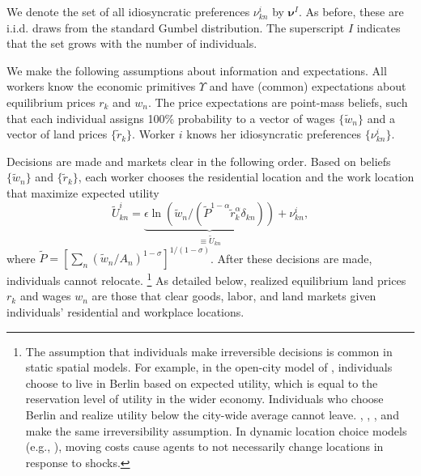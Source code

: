 \documentclass[11pt]{article}
\theoremstyle{definition}
\newcommand\idiosyncraticphrase{idiosyncratic preference}
\begin{document}
We denote the set of all idiosyncratic preferences $\nu_{kn}^i$ by $\boldsymbol \nu^{I}$.
As before, these are i.i.d. draws from the standard Gumbel distribution.
The superscript $I$ indicates that the set grows with the number of individuals.

We make the following assumptions about information and expectations.
All workers know the economic primitives $\Upsilon$
and have (common) expectations about equilibrium prices $r_k$ and $w_n$.
The price expectations are point-mass beliefs,
such that each individual assigns 100\% probability to a vector of wages $\{\tilde{w}_{n}\}$ and a vector of land prices $\{\tilde{r}_{k}\}$.
Worker $i$ knows her \idiosyncraticphrase s $\{\nu_{kn}^{i}\}$.

Decisions are made and markets clear in the following order.
Based on beliefs $\{\tilde{w}_{n}\}$ and $\{\tilde{r}_{k}\}$, each worker chooses the residential location and the work location that maximize expected utility
\begin{equation} \label{eqn:utility:beliefs} 
\tilde{U}_{kn}^{i} = 
\underbrace{\epsilon \ln\left({\tilde{w}_n}/\left({\tilde{P}^{1-\alpha}\tilde{r}_{k}^{\alpha} \delta_{kn}}\right)\right)}_{\equiv \tilde{U}_{kn}} + \nu_{kn}^i
,
\end{equation}
where $\tilde{P} = \left[\sum_{n} \left(\tilde{w}_n/A_n\right)^{1-\sigma}\right]^{1/(1-\sigma)}$.
After these decisions are made, individuals cannot relocate.%
\footnote{%
The assumption that individuals make irreversible decisions is common in static spatial models.
For example, in the open-city model of \cite{AhlfeldtReddingSturmWolf:2015}, individuals choose to live in Berlin based on expected utility, which is equal to the reservation level of utility in the wider economy.
Individuals who choose Berlin and realize utility below the city-wide average cannot leave.
\cite{ReddingRossi-Hansberg:2017}, \cite{HeblichReddingSturm:2020}, \cite{OwensRossi-HansbergSarte:2020}, and \cite{BrinkmanLin:2022} make the same irreversibility assumption.
In dynamic location choice models (e.g., \citealt{DiamondMcQuadeQian:2019}), moving costs cause agents to not necessarily change locations in response to shocks.
}
As detailed below,
realized equilibrium land prices $r_k$ and wages $w_n$ are those that clear goods, labor, and land markets given individuals' residential and workplace locations.
\end{document}
